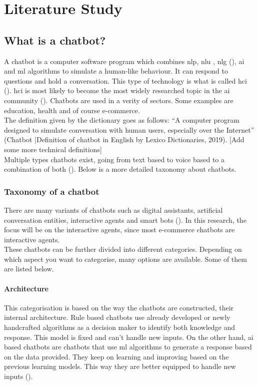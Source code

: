 \mainmatter
\pagestyle{headings}

\chapter{Literature Study}
\label{ch:literature-study}

\section{What is a chatbot?}
A chatbot is a computer software program which combines \acrfull{nlp}, \acrfull{nlu} , \acrfull{nlg} (\cite{Adamopoulou2020}), \acrfull{ai} and \acrfull{ml} algorithms to simulate a human-like behaviour. It can respond to questions and hold a conversation. This type of technology is what is called \acrfull{hci} (\cite{Adamopoulou2020}).  \acrshort{hci} is most likely to become the most widely researched topic in the \acrshort{ai} community (\cite{Bansal2018}). Chatbots are used in a verity of sectors. Some examples are education, health and of course e-commerce.\\
\break
The definition given by the dictionary goes as follows: “A computer program designed to simulate conversation with human users, especially over the Internet” (Chatbot |Definition of chatbot in English by Lexico Dictionaries, 2019). [Add some more technical definitions]\\
\break
Multiple types chatbots exist, going from text based to voice based to a combination of both (\cite{Radziwil2021}). Below is a more detailed taxonomy about chatbots.\\

\subsection{Taxonomy of a chatbot}
There are many variants of chatbots such as digital assistants, artificial conversation entities, interactive agents and smart bots (\cite{Adamopoulou2020}). In this research, the focus will be on the interactive agents, since most e-commerce chatbots are interactive agents.\\
\break
These chatbots can be further divided into different categories. Depending on which aspect you want to categorise, many options are available. Some of them are listed below.\\

\subsubsection{Architecture}
This categorisation is based on the way the chatbots are constructed, their internal architecture. Rule based chatbots use already developed or newly handcrafted algorithms as a decision maker to identify both knowledge and response. This model is fixed and can’t handle new inputs. On the other hand, \acrshort{ai} based chatbots are chatbots that use \acrlong{ml} algorithms to generate a response based on the data provided. They keep on learning and improving based on the previous learning models. This way they are better equipped to handle new inputs (\cite{Maroengsit2019}).\\

